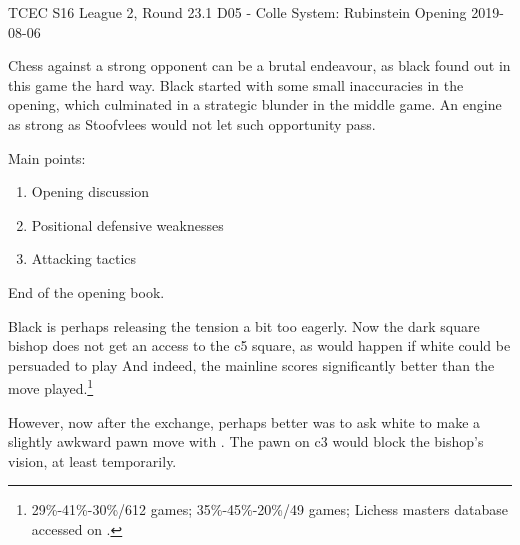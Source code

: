 
%
          {TCEC S16 League 2, Round 23.1}%
          {D05 - Colle System: Rubinstein Opening}%
          {2019-08-06}

Chess against a strong opponent can be a brutal endeavour, as black
found out in this game the hard way. Black started with some small
inaccuracies in the opening, which culminated in a strategic blunder
in the middle game. An engine as strong as Stoofvlees would not let
such opportunity pass.

Main points:
\begin{enumerate}
\item Opening discussion
\item Positional defensive weaknesses
\item Attacking tactics
\end{enumerate}


End of the opening book.


Black is perhaps releasing the tension a bit too eagerly. Now the dark
square bishop does not get an access to the c5 square, as would happen
if white could be persuaded to play  And indeed, the
mainline  scores significantly better than the
move played.\footnote{ 29\%-41\%-30\%/612
games;  35\%-45\%-20\%/49 games; Lichess
masters database accessed on .}


However, now after the exchange, perhaps better was to ask white to
make a slightly awkward pawn move with . The
pawn on c3 would block the bishop's vision, at least temporarily.

